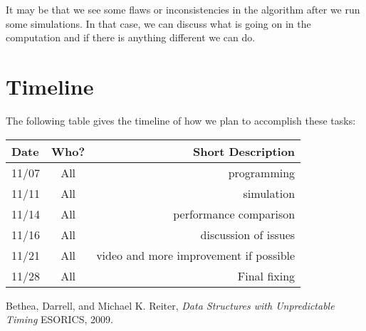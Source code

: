 \documentclass[11pt,twocolumn]{article}
\begin{document}
It may be that we see some flaws or inconsistencies in the algorithm after we run some simulations. In that case, we can discuss what is going on in the computation and if there is anything different we can do.



 

\newpage
\onecolumn
\appendix
\section{Timeline}

The following table gives the timeline of how we plan to accomplish these tasks:

\begin{table}[h!]
\centering
\begin{tabular}{ |l | c | r|}
  \hline
  Date & Who? & Short Description \\
  \hline
  \hline
  11/07 & All & programming \\
  \hline
  11/11 & All & simulation \\
  
  \hline
  11/14 & All & performance comparison \\
  
  \hline
  11/16 & All & discussion of issues \\
  
  \hline
  11/21 & All & video and more improvement if possible \\
  
 
  \hline
  11/28 & All & Final fixing \\
  \hline
\end{tabular}
\end{table}

\pagebreak

\begin{thebibliography}{9}
	
	Bethea, Darrell, and Michael K. Reiter,
	\emph{Data Structures with Unpredictable Timing}
	ESORICS,
	2009.
	
\end{thebibliography}
\end{document}
